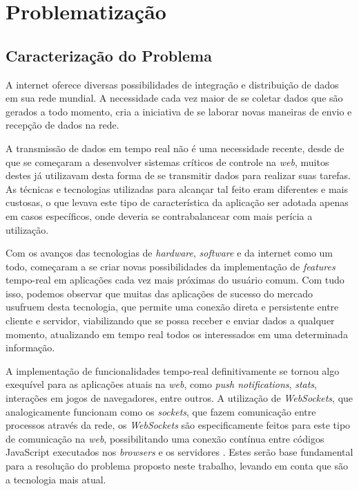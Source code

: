 \chapter{Problematização}
\section{Caracterização do Problema}
A internet oferece diversas possibilidades de integração e distribuição de dados em sua rede mundial. A necessidade cada vez maior de se coletar dados que são gerados a todo momento, cria a iniciativa de se laborar novas maneiras de envio e recepção de dados na rede.

A transmissão de dados em tempo real não é uma necessidade recente, desde de que se começaram a desenvolver sistemas críticos de controle na \textit{web}, muitos destes já utilizavam desta forma de se transmitir dados para realizar suas tarefas. As técnicas e tecnologias utilizadas para alcançar tal feito eram diferentes e mais custosas, o que levava este tipo de característica da aplicação ser adotada apenas em casos específicos, onde deveria se contrabalancear com mais perícia a utilização.

Com os avanços das tecnologias de \textit{hardware}, \textit{software} e da internet como um todo, começaram a se criar novas possibilidades da implementação de \textit{features} tempo-real em aplicações cada vez mais próximas do usuário comum. Com tudo isso, podemos observar que muitas das aplicações de sucesso do mercado usufruem desta tecnologia, que permite uma conexão direta e persistente entre cliente e servidor, viabilizando que se possa receber e enviar dados a qualquer momento, atualizando em tempo real todos os interessados em uma determinada informação.

A implementação de funcionalidades tempo-real definitivamente se tornou algo exequível para as aplicações atuais na \textit{web}, como \textit{push notifications}, \textit{stats}, interações em jogos de navegadores, entre outros. A utilização de \textit{WebSockets}, que analogicamente funcionam como os \textit{sockets}, que fazem comunicação entre processos através da rede, os \textit{WebSockets} são especificamente feitos para este tipo de comunicação na \textit{web}, possibilitando uma conexão contínua entre códigos JavaScript executados nos \textit{browsers} e os servidores . Estes serão base fundamental para a resolução do problema proposto neste trabalho, levando em conta que são a tecnologia mais atual.

